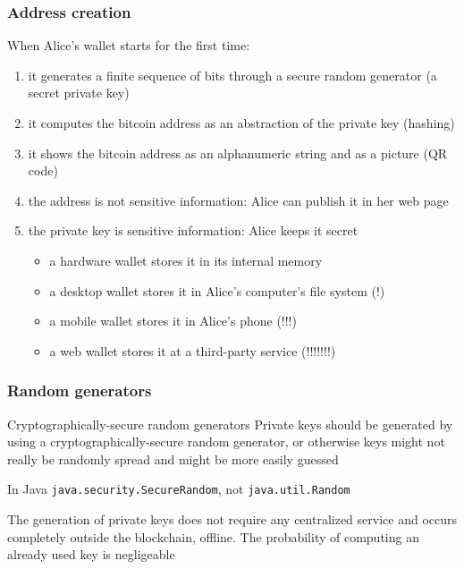 \documentclass[11pt]{beamer}  %
\begin{document}
\begin{frame}\frametitle{Address creation}

  When Alice's wallet starts for the first time:

  \begin{enumerate}
  \item it generates a finite sequence of bits through a secure random generator
    (a secret private key)
  \item it computes the bitcoin address as an abstraction of the private key
    (hashing)
  \item it shows the bitcoin address as an alphanumeric string and as a picture (QR code)
  \item \alert{the address is not sensitive information}: Alice can publish it in her web page
  \item \alert{the private key is sensitive information}: Alice keeps it secret
    \begin{itemize}
    \item a hardware wallet stores it in its internal memory
    \item a desktop wallet stores it in Alice's computer's file system (!)
    \item a mobile wallet stores it in Alice's phone (!!!)
    \item a web wallet stores it at a third-party service (!!!!!!!)
    \end{itemize}
  \end{enumerate}
\end{frame}

\begin{frame}\frametitle{Random generators}

  \begin{redbox}{Cryptographically-secure random generators}
    Private keys should be generated by using a cryptographically-secure
    random generator, or otherwise keys might not really be randomly
    spread and might be more easily guessed
  \end{redbox}

  \medskip

  \begin{greenbox}{In Java}
    \texttt{java.security.SecureRandom}, not \texttt{java.util.Random}
  \end{greenbox}

  \medskip

  \begin{greenbox}{}
    The generation of private keys does not require any
    centralized service and occurs completely outside the blockchain,
    offline. The probability of computing an already used key is negligeable
  \end{greenbox}

\end{frame}
\end{document}
